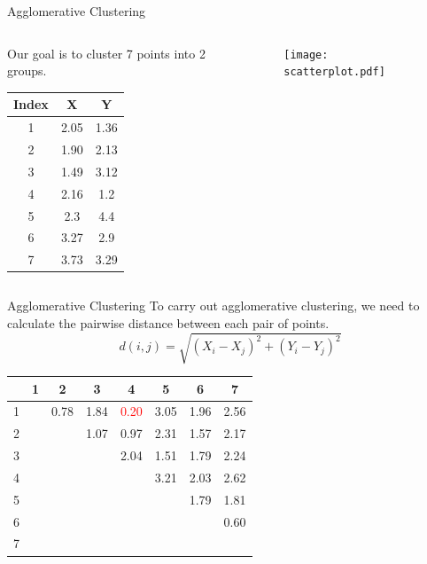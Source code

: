 \documentclass{beamer}
\begin{document}
	\begin{frame}{Agglomerative Clustering}
		\begin{columns}
			\begin{column}{0.4\linewidth}
				Our goal is to cluster 7 points into 2 groups.
				\begin{table}[htbp]
					\centering
					\begin{tabular}{ccc}
						\toprule
						Index & X & Y\\
						\midrule
						1 & 2.05 & 1.36\\
						2 & 1.90 & 2.13\\
						3 & 1.49 & 3.12\\
						4 & 2.16 & 1.2\\
						5 & 2.3 & 4.4\\
						6 & 3.27 & 2.9\\
						7 & 3.73 & 3.29\\
						\bottomrule
					\end{tabular}
				\end{table}
			\end{column}
			\begin{column}{0.6\linewidth}
				\begin{figure}[htbp]
					\centering
					\texttt{[image: scatterplot.pdf]}
				\end{figure}
			\end{column}
		\end{columns}
	\end{frame}
	
	\begin{frame}{Agglomerative Clustering}
		To carry out agglomerative clustering, we need to calculate the pairwise distance between each pair of points.
		\[ d(i, j) = \sqrt{(X_i - X_j)^2 + (Y_i - Y_j)^2 }\]
		
		\begin{table}
			\centering
			\begin{tabular}{c|ccccccc}
				&1&2&3&4&5&6&7\\
				\hline
				1&&0.78&1.84&\textcolor{red}{0.20}&3.05&1.96&2.56\\
				2&&&1.07&0.97&2.31&1.57&2.17\\
				3&&&&2.04&1.51&1.79&2.24\\
				4&&&&&3.21&2.03&2.62\\
				5&&&&&&1.79&1.81\\
				6&&&&&&&0.60\\
				7&&&&&&&\\
			\end{tabular}
		\end{table}
	\end{frame}
	
\end{document}
